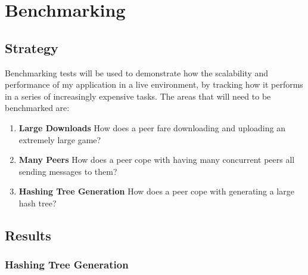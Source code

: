 \section{Benchmarking}

\subsection*{Strategy}

Benchmarking tests will be used to demonstrate how the scalability and performance of my application in a live environment, by tracking how it performs in a series of increasingly expensive tasks. The areas that will need to be benchmarked are:

\begin{enumerate}
  \item \textbf{Large Downloads} How does a peer fare downloading and uploading an extremely large game?
  \item \textbf{Many Peers} How does a peer cope with having many concurrent peers all sending messages to them?
  \item \textbf{Hashing Tree Generation} How does a peer cope with generating a large hash tree?
\end{enumerate}

\subsection*{Results}

\subsubsection*{Hashing Tree Generation}